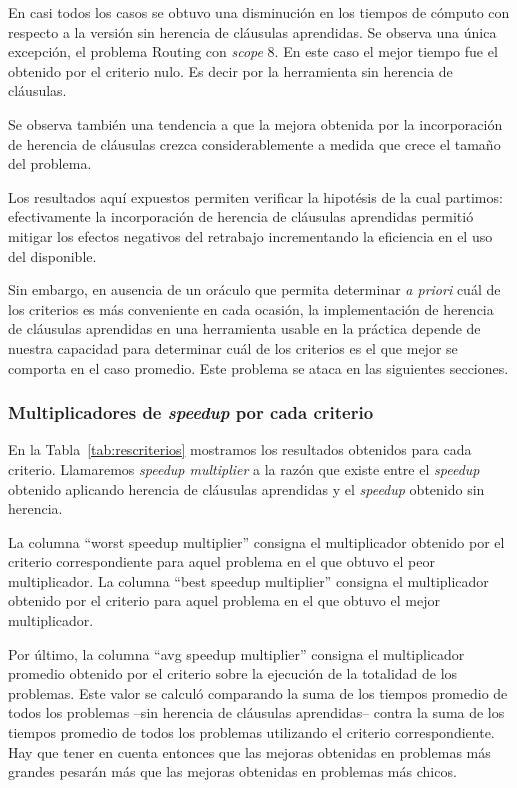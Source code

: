 En casi todos los casos se obtuvo una disminución en los tiempos de cómputo
con respecto a la versión sin herencia de cláusulas aprendidas. Se observa una
única excepción, el problema Routing con \emph{scope} 8. En este caso el mejor
tiempo fue el obtenido por el criterio nulo. Es decir por la herramienta sin
herencia de cláusulas.

Se observa también una tendencia a que la mejora obtenida por la incorporación
de herencia de cláusulas crezca considerablemente a medida que crece el tamaño
del problema.

Los resultados aquí expuestos permiten verificar la hipotésis de la cual
partimos: efectivamente la incorporación de herencia de cláusulas aprendidas
permitió mitigar los efectos negativos del retrabajo incrementando la
eficiencia en el uso del \hard disponible.

Sin embargo, en ausencia de un oráculo que permita determinar \emph{a priori}
cuál de los criterios es más conveniente en cada ocasión, la implementación de
herencia de cláusulas aprendidas en una herramienta usable en la práctica
depende de nuestra capacidad para determinar cuál de los criterios es el que
mejor se comporta en el caso promedio. Este problema se ataca en las
siguientes secciones.

\subsubsection{Multiplicadores de \emph{speedup} por cada criterio}
\label{sec:resultadosaprendizaje}

En la Tabla~\ref{tab:rescriterios} mostramos los resultados obtenidos para
cada criterio. Llamaremos \emph{speedup multiplier} a la razón que existe
entre el \emph{speedup} obtenido aplicando herencia de cláusulas aprendidas y
el \emph{speedup} obtenido sin herencia.

La columna ``worst speedup multiplier'' consigna el multiplicador obtenido por
el criterio correspondiente para aquel problema en el que obtuvo el peor
multiplicador. La columna ``best speedup multiplier'' consigna el
multiplicador obtenido por el criterio para aquel problema en el que obtuvo el
mejor multiplicador.

Por último, la columna ``avg speedup multiplier'' consigna el multiplicador
promedio obtenido por el criterio sobre la ejecución de la totalidad de los
problemas. Este valor se calculó comparando la suma de los tiempos promedio de
todos los problemas --sin herencia de cláusulas aprendidas-- contra la suma de
los tiempos promedio de todos los problemas utilizando el criterio
correspondiente. Hay que tener en cuenta entonces que las mejoras obtenidas en
problemas más grandes pesarán más que las mejoras obtenidas en problemas más
chicos.

